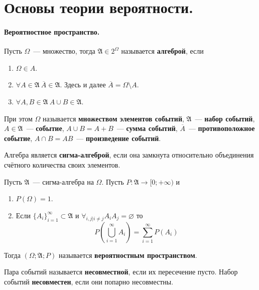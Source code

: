\documentclass{article}
\newcommand{\A}{{\mathfrak A}}
\begin{document}
    \tableofcontents
    \section{Основы теории вероятности.}
    \paragraph{Вероятностное пространство.}
    \begin{definition}
        Пусть $\Omega$~--- множество, тогда $\A\in 2^\Omega$ называется \textbf{алгеброй}, если
        \begin{enumerate}
            \item $\Omega\in A$.
            \item $\forall A\in\mathfrak A~\overline A\in\A$. Здесь и далее $\overline A=\Omega\setminus A$.
            \item $\forall A,B\in\A~A\cup B\in\A$.
        \end{enumerate}
        При этом $\Omega$ называется \textbf{множеством элементов событий}, $\A$~--- \textbf{набор событий}, $A\in\A$~--- \textbf{событие}, $A\cup B=A+B$~--- \textbf{сумма событий}, $\overline A$~--- \textbf{противоположное событие}, $A\cap B=AB$~--- \textbf{произведение событий}.
    \end{definition}
    \begin{definition}
        Алгебра является \textbf{сигма-алгеброй}, если она замкнута относительно объединения счётного количества своих элементов.
    \end{definition}
    \begin{definition}
        Пусть $\A$~--- сигма-алгебра на $\Omega$. Пусть $P\colon \A\to\mathbb [0;+\infty)$ и
        \begin{enumerate}
            \item $P(\Omega)=1$.
            \item Если $\{A_i\}_{i=1}^\infty\subset\A$ и $\forall_{i, j| i \ne j} A_iA_j=\varnothing$ то
            $$
            P\left(\bigcup\limits_{i=1}^\infty A_i\right)=\sum\limits_{i=1}^\infty P(A_i)
            $$
        \end{enumerate}
        Тогда $(\Omega;\A;P)$ называется \textbf{вероятностным пространством}.
    \end{definition}
    \begin{definition}
        Пара событий называется \textbf{несовместной}, если их пересечение пусто. Набор событий \textbf{несовместен}, если они попарно несовместны.
    \end{definition}
\end{document}
